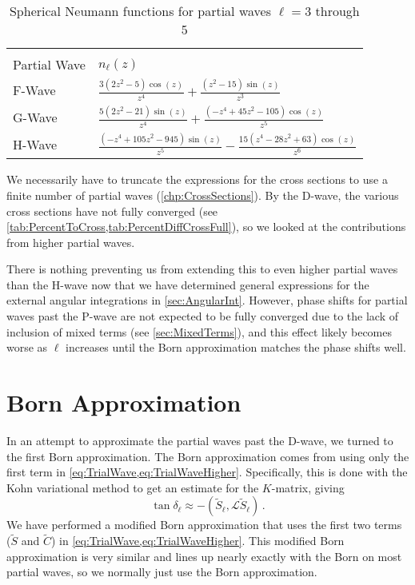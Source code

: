 \documentclass[Dissertation.tex]{subfiles}
\begin{document}
{
\renewcommand{\arraystretch}{1.5}
\begin{table}[H]
\centering
\begin{tabular}{l l}
\toprule\\[-1.2cm]
Partial Wave & $n_\ell(z)$ \\
\midrule
F-Wave & $\frac{3 \left(2 z^2-5\right) \cos (z)}{z^4}+\frac{\left(z^2-15\right) \sin (z)}{z^3}$ \\
G-Wave & $\frac{5 \left(2 z^2-21\right) \sin (z)}{z^4}+\frac{\left(-z^4+45 z^2-105\right) \cos (z)}{z^5}$ \\
H-Wave & $\frac{\left(-z^4+105 z^2-945\right) \sin (z)}{z^5}-\frac{15 \left(z^4-28 z^2+63\right) \cos (z)}{z^6}$ \\
\bottomrule
\end{tabular}
\caption{Spherical Neumann functions for partial waves $\ell = 3$ through 5}
\label{tab:SphNeum}
\end{table}
}

We necessarily have to truncate the expressions for the cross
sections to use a finite number of partial waves (\cref{chp:CrossSections}).
By the D-wave, the various cross sections have not
fully converged (see \cref{tab:PercentToCross,tab:PercentDiffCrossFull}), so 
we looked at the contributions from higher partial waves.

There is nothing preventing us from extending this to even higher partial 
waves than the H-wave now that we have determined general expressions for the 
external angular integrations in \cref{sec:AngularInt}. However, phase shifts 
for partial waves past the P-wave are not expected to be fully converged due 
to the lack of inclusion of mixed terms (see \cref{sec:MixedTerms}), and this 
effect likely becomes worse as $\ell$ increases until the Born approximation
matches the phase shifts well.


\section{Born Approximation}
\label{sec:Born}
In an attempt to approximate the partial waves past the D-wave, we turned to 
the first Born approximation. The Born approximation comes from using only the 
first term in \cref{eq:TrialWave,eq:TrialWaveHigher}. Specifically, this is 
done with the Kohn variational method to get an estimate for the $K$-matrix, 
giving \cite[p.590]{Bransden2003}
\begin{equation}
\label{eq:Born}
\tan\delta_\ell \approx -(\widetilde{S}_\ell,\mathcal{L}\widetilde{S}_\ell )\,.
\end{equation}
We have performed a modified Born approximation that uses the first two 
terms ($\widetilde{S}$ and $\widetilde{C}$) in \cref{eq:TrialWave,eq:TrialWaveHigher}.
This modified Born approximation is very similar and lines up nearly exactly 
with the Born on most partial waves, so we normally just use the Born 
approximation.
\end{document}
